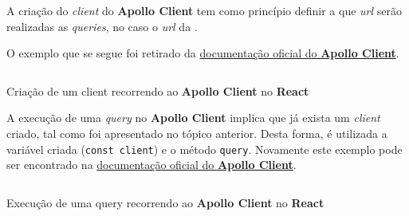 
A criação do \textit{client} do \textbf{Apollo Client} tem como princípio definir a que \textit{url} serão realizadas as \textit{queries}, no caso o \textit{url} da .

O exemplo que se segue foi retirado da \href{https://www.apollographql.com/docs/react/get-started/}{documentação oficial do \textbf{Apollo Client}}.

\begin{longlisting}
	\inputminted[highlightlines={3-6},highlightcolor=yellow!25]{js}{code/graphql/create-apollo-client.ts}
	\caption{Criação de um client recorrendo ao \textbf{Apollo Client} no \textbf{React}}
\end{longlisting}


A execução de uma \textit{query} no \textbf{Apollo Client} implica que já exista um \textit{client} criado, tal como foi apresentado no tópico anterior. Desta forma, é utilizada a variável criada (\texttt{const client}) e o método \texttt{query}. Novamente este exemplo pode ser encontrado na \href{https://www.apollographql.com/docs/react/get-started/}{documentação oficial do \textbf{Apollo Client}}.

\begin{longlisting}
	\inputminted[highlightlines={7-13},highlightcolor=yellow!25]{js}{code/graphql/use-apollo-client.ts}
	\caption{Execução de uma query recorrendo ao \textbf{Apollo Client} no \textbf{React}}
\end{longlisting}

